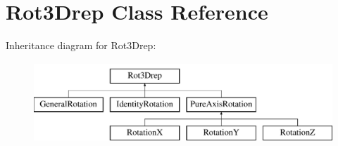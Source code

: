 \hypertarget{classRot3Drep}{}\section{Rot3\+Drep Class Reference}
\label{classRot3Drep}
Inheritance diagram for Rot3\+Drep\+:\begin{figure}[H]
\begin{center}
\leavevmode
\includegraphics[height=3.000000cm]{classRot3Drep}
\end{center}
\end{figure}
